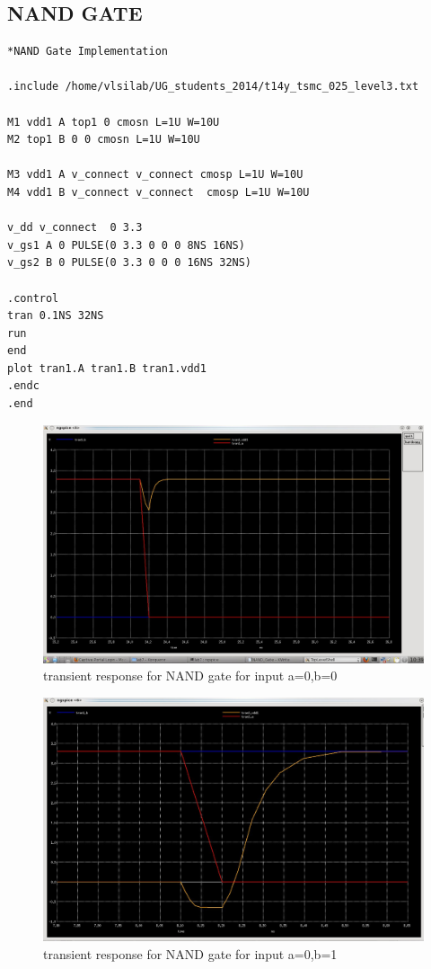 \documentclass[12pt,a4paper]{article}
\begin{document}
\begin{center}
\vspace{20pt}
\subsection{NAND GATE}
\begin{lstlisting}
*NAND Gate Implementation

.include /home/vlsilab/UG_students_2014/t14y_tsmc_025_level3.txt

M1 vdd1 A top1 0 cmosn L=1U W=10U
M2 top1 B 0 0 cmosn L=1U W=10U

M3 vdd1 A v_connect v_connect cmosp L=1U W=10U 
M4 vdd1 B v_connect v_connect  cmosp L=1U W=10U

v_dd v_connect  0 3.3
v_gs1 A 0 PULSE(0 3.3 0 0 0 8NS 16NS)
v_gs2 B 0 PULSE(0 3.3 0 0 0 16NS 32NS)

.control
tran 0.1NS 32NS
run
end
plot tran1.A tran1.B tran1.vdd1 
.endc
.end 
\end{lstlisting}


\clearpage
\begin{figure}[h]
\centering
\includegraphics[scale=.33]{NAND_Gate_00.jpeg}
\caption[Short]{transient response for NAND gate for input a=0,b=0 }
\end{figure}

\vspace{30pt}
\begin{figure}[h]
\centering
\includegraphics[scale=.33]{NAND_Gate_01.jpeg}
\caption[Short]{transient response for NAND gate for input a=0,b=1 }
\end{figure}


\end{center}
\end{document}
